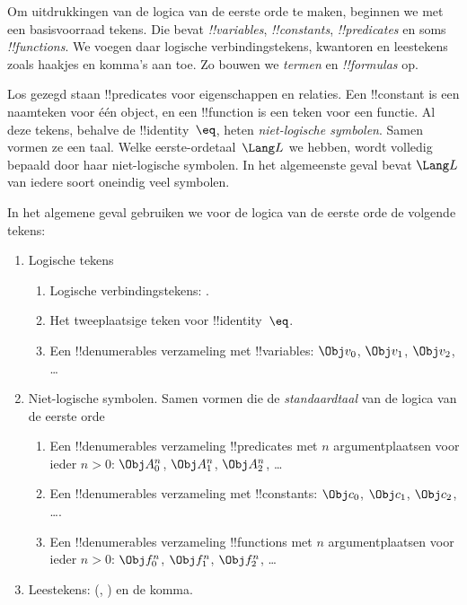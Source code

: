 \documentclass[../../../include/open-logic-section]{subfiles}
\begin{document}



Om uitdrukkingen van de logica van de eerste orde te maken, beginnen we
met een basisvoorraad tekens. Die bevat \emph{!!{variable}s},
\emph{!!{constant}s}, \emph{!!{predicate}s} en soms
\emph{!!{function}s}. We voegen daar logische verbindingstekens,
kwantoren en leestekens zoals haakjes en komma's aan toe. Zo bouwen we
\emph{termen} en \emph{!!{formula}s} op.

\begin{explain}
Los gezegd staan !!{predicate}s voor eigenschappen en relaties. Een
!!{constant} is een naamteken voor één object, en een !!{function} is
een teken voor een functie. Al deze tekens, behalve de
!!{identity}~$\eq$, heten \emph{niet-logische symbolen}. Samen vormen ze
een taal. Welke eerste-ordetaal~$\Lang L$ we hebben, wordt volledig
bepaald door haar niet-logische symbolen. In het algemeenste geval
bevat $\Lang L$ van iedere soort oneindig veel symbolen.
\end{explain}

In het algemene geval gebruiken we voor de logica van de eerste orde
de volgende tekens:

\begin{enumerate}
\item Logische tekens
\begin{enumerate}
\item Logische verbindingstekens:
  \startycommalist
  .
\item Het tweeplaatsige teken voor !!{identity}~$\eq$.
\item Een !!{denumerable}s verzameling met !!{variable}s: $\Obj v_0$, $\Obj v_1$, $\Obj
  v_2$, \dots
\end{enumerate}
\item Niet-logische symbolen. Samen vormen die de \emph{standaardtaal}
  van de logica van de eerste orde
\begin{enumerate}
\item Een !!{denumerable}s verzameling !!{predicate}s met $n$ argumentplaatsen voor ieder $n>0$: $\Obj
  A^n_0$, $\Obj A^n_1$, $\Obj A^n_2$, \dots
\item Een !!{denumerable}s verzameling met !!{constant}s: $\Obj c_0$, $\Obj c_1$, $\Obj
  c_2$, \dots.
\item Een !!{denumerable}s verzameling !!{function}s met $n$ argumentplaatsen voor ieder $n>0$:
  $\Obj f^n_0$, $\Obj f^n_1$, $\Obj f^n_2$, \dots
\end{enumerate}
\item Leestekens: (, ) en de komma.
\end{enumerate}
\end{document}
